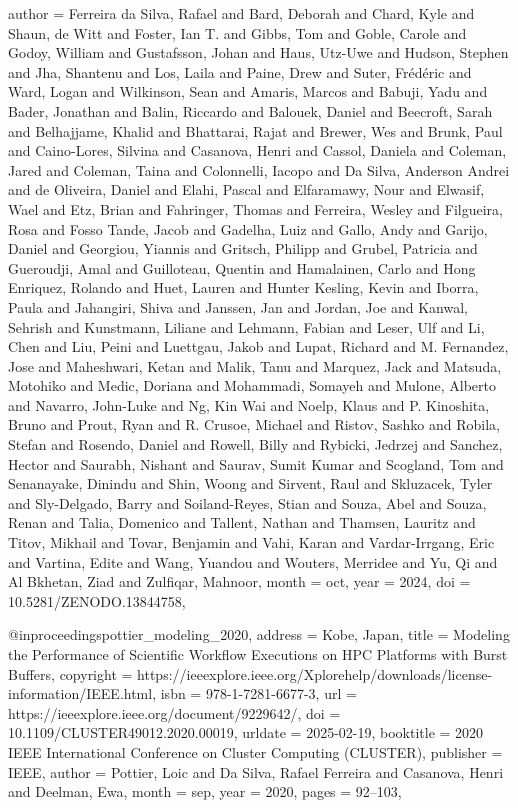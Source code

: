 {	author = {Ferreira da Silva, Rafael and Bard, Deborah and Chard, Kyle and Shaun, de Witt and Foster, Ian T. and Gibbs, Tom and Goble, Carole and Godoy, William and Gustafsson, Johan and Haus, Utz-Uwe and Hudson, Stephen and Jha, Shantenu and Los, Laila and Paine, Drew and Suter, Frédéric and Ward, Logan and Wilkinson, Sean and Amaris, Marcos and Babuji, Yadu and Bader, Jonathan and Balin, Riccardo and Balouek, Daniel and Beecroft, Sarah and Belhajjame, Khalid and Bhattarai, Rajat and Brewer, Wes and Brunk, Paul and Caino-Lores, Silvina and Casanova, Henri and Cassol, Daniela and Coleman, Jared and Coleman, Taina and Colonnelli, Iacopo and Da Silva, Anderson Andrei and de Oliveira, Daniel and Elahi, Pascal and Elfaramawy, Nour and Elwasif, Wael and Etz, Brian and Fahringer, Thomas and Ferreira, Wesley and Filgueira, Rosa and Fosso Tande, Jacob and Gadelha, Luiz and Gallo, Andy and Garijo, Daniel and Georgiou, Yiannis and Gritsch, Philipp and Grubel, Patricia and Gueroudji, Amal and Guilloteau, Quentin and Hamalainen, Carlo and Hong Enriquez, Rolando and Huet, Lauren and Hunter Kesling, Kevin and Iborra, Paula and Jahangiri, Shiva and Janssen, Jan and Jordan, Joe and Kanwal, Sehrish and Kunstmann, Liliane and Lehmann, Fabian and Leser, Ulf and Li, Chen and Liu, Peini and Luettgau, Jakob and Lupat, Richard and M. Fernandez, Jose and Maheshwari, Ketan and Malik, Tanu and Marquez, Jack and Matsuda, Motohiko and Medic, Doriana and Mohammadi, Somayeh and Mulone, Alberto and Navarro, John-Luke and Ng, Kin Wai and Noelp, Klaus and P. Kinoshita, Bruno and Prout, Ryan and R. Crusoe, Michael and Ristov, Sashko and Robila, Stefan and Rosendo, Daniel and Rowell, Billy and Rybicki, Jedrzej and Sanchez, Hector and Saurabh, Nishant and Saurav, Sumit Kumar and Scogland, Tom and Senanayake, Dinindu and Shin, Woong and Sirvent, Raul and Skluzacek, Tyler and Sly-Delgado, Barry and Soiland-Reyes, Stian and Souza, Abel and Souza, Renan and Talia, Domenico and Tallent, Nathan and Thamsen, Lauritz and Titov, Mikhail and Tovar, Benjamin and Vahi, Karan and Vardar-Irrgang, Eric and Vartina, Edite and Wang, Yuandou and Wouters, Merridee and Yu, Qi and Al Bkhetan, Ziad and Zulfiqar, Mahnoor},
	month = oct,
	year = {2024},
	doi = {10.5281/ZENODO.13844758},
}


@inproceedings{pottier_modeling_2020,
	address = {Kobe, Japan},
	title = {Modeling the {Performance} of {Scientific} {Workflow} {Executions} on {HPC} {Platforms} with {Burst} {Buffers}},
	copyright = {https://ieeexplore.ieee.org/Xplorehelp/downloads/license-information/IEEE.html},
	isbn = {978-1-7281-6677-3},
	url = {https://ieeexplore.ieee.org/document/9229642/},
	doi = {10.1109/CLUSTER49012.2020.00019},
	urldate = {2025-02-19},
	booktitle = {2020 {IEEE} {International} {Conference} on {Cluster} {Computing} ({CLUSTER})},
	publisher = {IEEE},
	author = {Pottier, Loic and Da Silva, Rafael Ferreira and Casanova, Henri and Deelman, Ewa},
	month = sep,
	year = {2020},
	pages = {92--103},
}


